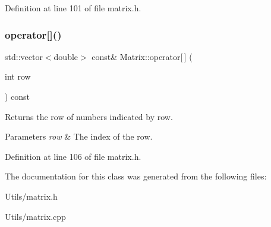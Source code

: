 Definition at line 101 of file matrix.\+h.

\mbox{\label{classMatrix_a120efaa8b3a945230e8a601927cb0e47}} 
\subsubsection{\texorpdfstring{operator[]()}{operator[]()}\hspace{0.1cm}{\footnotesize\ttfamily [2/2]}}
{\footnotesize\ttfamily std\+::vector$<$double$>$ const\& Matrix\+::operator\mbox{[}$\,$\mbox{]} (\begin{DoxyParamCaption}\item[{int}]{row }\end{DoxyParamCaption}) const\hspace{0.3cm}{\ttfamily [inline]}}

Returns the row of numbers indicated by {\ttfamily row}.


\begin{DoxyParams}{Parameters}
{\em row} & The index of the row. \\
\hline
\end{DoxyParams}


Definition at line 106 of file matrix.\+h.



The documentation for this class was generated from the following files\+:\begin{DoxyCompactItemize}
\item 
Utils/matrix.\+h\item 
Utils/matrix.\+cpp\end{DoxyCompactItemize}

